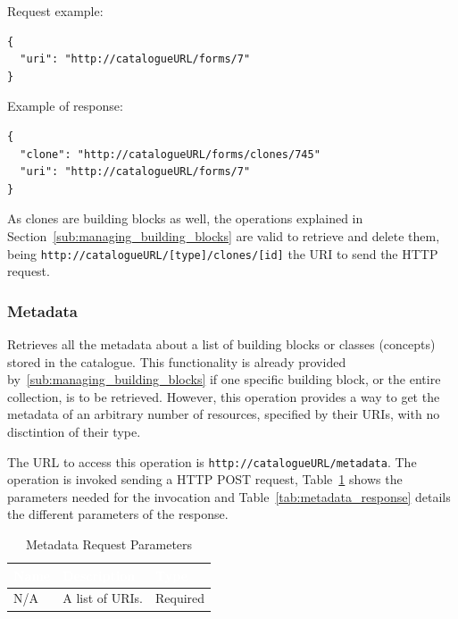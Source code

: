 \documentclass{fast_latex}
\begin{document}
Request example:

\singlespacing
\begin{verbatim}
{
  "uri": "http://catalogueURL/forms/7"
}
\end{verbatim}
\doublespacing

Example of response:

\singlespacing
\begin{verbatim}
{
  "clone": "http://catalogueURL/forms/clones/745"
  "uri": "http://catalogueURL/forms/7"
}
\end{verbatim}
\doublespacing

As clones are building blocks as well, the operations explained in Section~\ref{sub:managing_building_blocks} are valid to retrieve and delete them, being \verb|http://catalogueURL/[type]/clones/[id]| the URI to send the HTTP request.


\subsubsection{Metadata} %
\label{ssub:metadata}

Retrieves all the metadata about a list of building blocks or classes (concepts) stored in the catalogue. This functionality is already provided by~\ref{sub:managing_building_blocks} if one specific building block, or the entire collection, is to be retrieved. However, this operation provides a way to get the metadata of an arbitrary number of resources, specified by their URIs, with no disctintion of their type.

The URL to access this operation is \verb|http://catalogueURL/metadata|. The operation is invoked sending a HTTP POST request, Table~\ref{tab:metadata_request} shows the parameters needed for the invocation and Table~\ref{tab:metadata_response} details the different parameters of the response.

\begin{table}[htb!]
\caption{Metadata Request Parameters}
\label{tab:metadata_request}
\begin{center}
\begin{tabular}{|p{2.5cm}|p{9cm}|p{2cm}|}
\hline
\rowcolor{fast@lightgrey}\textcolor{white}{Name} &
                         \textcolor{white}{Description} &
                         \textcolor{white}{Type}\\ \hline
N/A & A list of URIs. & Required\\ \hline
\end{tabular}
\end{center}
\end{table}
\end{document}
